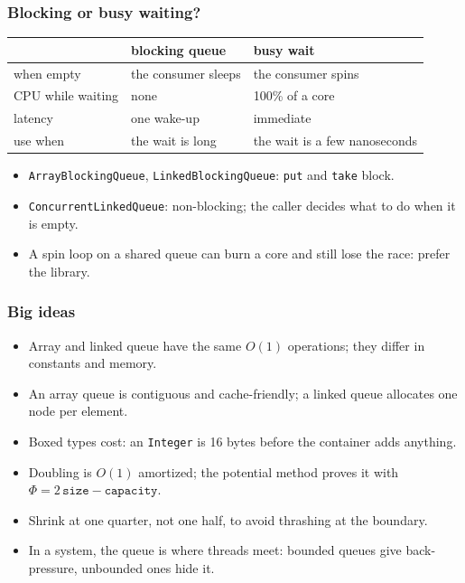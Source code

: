 \documentclass[aspectratio=169,10pt,compress]{beamer}
\begin{document}
\begin{frame}[t,fragile] \frametitle{Blocking or busy waiting?}
  \begin{center}\small
  \begin{tabular}{@{}lll@{}}
    \toprule
     & \textbf{blocking queue} & \textbf{busy wait} \\
    \midrule
    when empty & the consumer sleeps & the consumer spins \\
    CPU while waiting & none & 100\% of a core \\
    latency & one wake-up & immediate \\
    use when & the wait is long & the wait is a few nanoseconds \\
    \bottomrule
  \end{tabular}
  \end{center}
  \vspace{0.4em}
  \begin{itemize}\small
    \item \texttt{ArrayBlockingQueue}, \texttt{LinkedBlockingQueue}: \texttt{put} and \texttt{take} block.
    \item \texttt{ConcurrentLinkedQueue}: non-blocking; the caller decides what to do when it is empty.
    \item A spin loop on a shared queue can burn a core and still lose the race: prefer the library.
  \end{itemize}
\end{frame}





\begin{frame}[t,fragile] \frametitle{Big ideas}
  \begin{itemize}
    \item Array and linked queue have the same $O(1)$ operations; they differ in constants and memory.
    \item An array queue is contiguous and cache-friendly; a linked queue allocates one node per element.
    \item Boxed types cost: an \texttt{Integer} is 16 bytes before the container adds anything.
    \item Doubling is $O(1)$ amortized; the potential method proves it with $\Phi = 2\,\texttt{size} - \texttt{capacity}$.
    \item Shrink at one quarter, not one half, to avoid thrashing at the boundary.
    \item In a system, the queue is where threads meet: bounded queues give back-pressure, unbounded ones hide it.
  \end{itemize}
\end{frame}
\end{document}
